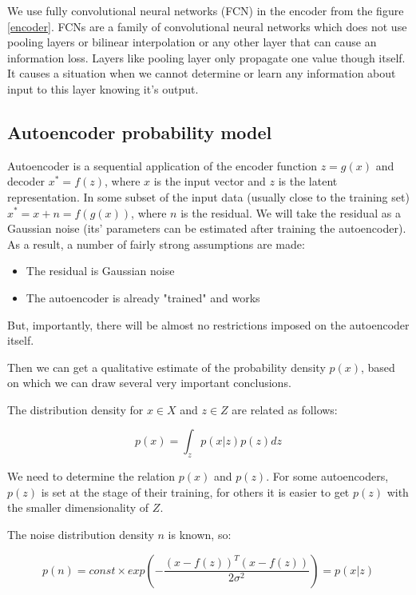 We use fully convolutional neural networks (FCN) in the encoder from the figure \ref{encoder}. FCNs are a family of convolutional neural networks which does not use pooling layers or bilinear interpolation or any other layer that can cause an information loss. Layers like pooling layer only propagate one value though itself. It causes a situation when we cannot determine or learn any information about input to this layer knowing it's output.

\subsection{Autoencoder probability model}

Autoencoder is a sequential application of the encoder function $z=g(x)$ and decoder $x^*=f(z)$, where $x$ is the input vector and $z$ is the latent representation. In some subset of the input data (usually close to the training set) $x^*=x+n=f(g(x))$, where $n$ is the residual. We will take the residual as a Gaussian noise (its' parameters can be estimated after training the autoencoder). As a result, a number of fairly strong assumptions are made:

\begin{itemize}
    \item The residual is Gaussian noise
    \item The autoencoder is already "trained" and works
\end{itemize}

But, importantly, there will be almost no restrictions imposed on the autoencoder itself.

Then we can get a qualitative estimate of the probability density $p(x)$, based on which we can draw several very important conclusions.

The distribution density for $x\in X$ and $z\in Z$ are related as follows:

\begin{equation}
    \label{eq:autoencoder-density}
    p(x) = \int_{z} p(x|z)p(z)dz
\end{equation}

We need to determine the relation $p(x)$ and $p(z)$. For some autoencoders, $p(z)$ is set at the stage of their training, for others it is easier to get $p(z)$ with the smaller dimensionality of $Z$.

The noise distribution density $n$ is known, so:

\begin{equation}
    \label{eq:autoencoder-noise-density}
    p(n)=const\times exp( -\frac{(x-f(z))^T (x-f(z))}{2\sigma^2} )=p(x|z)
\end{equation}

